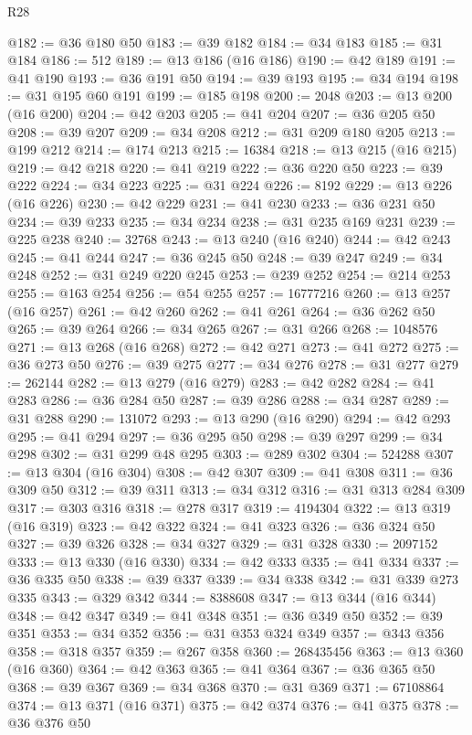 \begin{lexlean}{R28}
\begin{coremodule}
@182 := @36 @180 @50
@183 := @39 @182
@184 := @34 @183
@185 := @31 @184
@186 := 512
@189 := @13 @186 (@16 @186)
@190 := @42 @189
@191 := @41 @190
@193 := @36 @191 @50
@194 := @39 @193
@195 := @34 @194
@198 := @31 @195 @60 @191
@199 := @185 @198
@200 := 2048
@203 := @13 @200 (@16 @200)
@204 := @42 @203
@205 := @41 @204
@207 := @36 @205 @50
@208 := @39 @207
@209 := @34 @208
@212 := @31 @209 @180 @205
@213 := @199 @212
@214 := @174 @213
@215 := 16384
@218 := @13 @215 (@16 @215)
@219 := @42 @218
@220 := @41 @219
@222 := @36 @220 @50
@223 := @39 @222
@224 := @34 @223
@225 := @31 @224
@226 := 8192
@229 := @13 @226 (@16 @226)
@230 := @42 @229
@231 := @41 @230
@233 := @36 @231 @50
@234 := @39 @233
@235 := @34 @234
@238 := @31 @235 @169 @231
@239 := @225 @238
@240 := 32768
@243 := @13 @240 (@16 @240)
@244 := @42 @243
@245 := @41 @244
@247 := @36 @245 @50
@248 := @39 @247
@249 := @34 @248
@252 := @31 @249 @220 @245
@253 := @239 @252
@254 := @214 @253
@255 := @163 @254
@256 := @54 @255
@257 := 16777216
@260 := @13 @257 (@16 @257)
@261 := @42 @260
@262 := @41 @261
@264 := @36 @262 @50
@265 := @39 @264
@266 := @34 @265
@267 := @31 @266
@268 := 1048576
@271 := @13 @268 (@16 @268)
@272 := @42 @271
@273 := @41 @272
@275 := @36 @273 @50
@276 := @39 @275
@277 := @34 @276
@278 := @31 @277
@279 := 262144
@282 := @13 @279 (@16 @279)
@283 := @42 @282
@284 := @41 @283
@286 := @36 @284 @50
@287 := @39 @286
@288 := @34 @287
@289 := @31 @288
@290 := 131072
@293 := @13 @290 (@16 @290)
@294 := @42 @293
@295 := @41 @294
@297 := @36 @295 @50
@298 := @39 @297
@299 := @34 @298
@302 := @31 @299 @48 @295
@303 := @289 @302
@304 := 524288
@307 := @13 @304 (@16 @304)
@308 := @42 @307
@309 := @41 @308
@311 := @36 @309 @50
@312 := @39 @311
@313 := @34 @312
@316 := @31 @313 @284 @309
@317 := @303 @316
@318 := @278 @317
@319 := 4194304
@322 := @13 @319 (@16 @319)
@323 := @42 @322
@324 := @41 @323
@326 := @36 @324 @50
@327 := @39 @326
@328 := @34 @327
@329 := @31 @328
@330 := 2097152
@333 := @13 @330 (@16 @330)
@334 := @42 @333
@335 := @41 @334
@337 := @36 @335 @50
@338 := @39 @337
@339 := @34 @338
@342 := @31 @339 @273 @335
@343 := @329 @342
@344 := 8388608
@347 := @13 @344 (@16 @344)
@348 := @42 @347
@349 := @41 @348
@351 := @36 @349 @50
@352 := @39 @351
@353 := @34 @352
@356 := @31 @353 @324 @349
@357 := @343 @356
@358 := @318 @357
@359 := @267 @358
@360 := 268435456
@363 := @13 @360 (@16 @360)
@364 := @42 @363
@365 := @41 @364
@367 := @36 @365 @50
@368 := @39 @367
@369 := @34 @368
@370 := @31 @369
@371 := 67108864
@374 := @13 @371 (@16 @371)
@375 := @42 @374
@376 := @41 @375
@378 := @36 @376 @50

\end{coremodule}
\end{lexlean}
